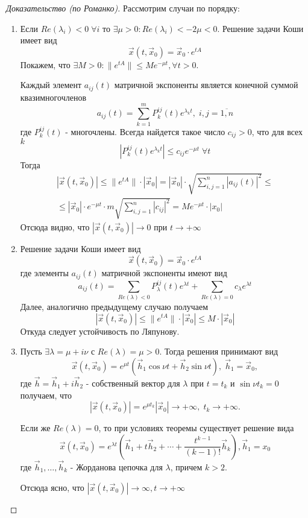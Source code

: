 \begin{proof}[Доказательство (по Романко)]
	Рассмотрим случаи по порядку:
	\begin{enumerate}
		\item Если $Re(\lambda_i)<0 \; \forall i$ то $\exists \mu >0 : Re(\lambda_i)< -2\mu < 0$. Решение задачи Коши имеет вид 
		\[
			\vec{x}(t, \vec{x}_0) = \vec{x}_0\cdot e^{tA}
		\]
		Покажем, что $\exists M>0: \|e^{tA}\| \leqslant Me^{-\mu t}, \forall t>0$.
		
		Каждый элемент $a_{ij}(t)$ матричной экспоненты является конечной суммой квазимногочленов
		\[
			a_{ij}(t) = \sum_{k=1}^m P_k^{ij}(t)e^{\lambda_kt},\;  i,j=\overline{1,n}
		\]
		где $P_k^{ij}(t)$ - многочлены. Всегда найдется такое число $c_{ij}>0$, что для всех $k$
		\[
			|P_k^{ij}(t)e^{\lambda_kt}|\leqslant c_{ij}e^{-\mu t} \; \forall t
		\]
		Тогда
		\begin{multline*}
		|\vec{x}(t, \vec{x}_0)|\leqslant \|e^{tA}\|\cdot|\vec{x}_0| = |\vec{x}_0|\cdot\sqrt{\sum_{i,j=1}^n|a_{ij}(t)|^2}\leqslant\\\leqslant|\vec{x}_0|\cdot e^{-\mu t}\cdot m \sqrt{\sum_{i,j=1}^n|c_{ij}|^2} = Me^{-\mu t}\cdot |x_0|
		\end{multline*}
		Отсюда видно, что $|\vec{x}(t, \vec{x}_0)| \to 0$ при $t \to +\infty$
	\item 
		Решение задачи Коши имеет вид 
		\[
		\vec{x}(t, \vec{x}_0) = \vec{x}_0\cdot e^{tA}
		\]
		где элементы $a_{ij}(t)$ матричной экспоненты имеют вид
		\[
			a_{ij}(t) = \sum_{Re(\lambda) < 0}P_\lambda^{ij}(t)e^{\lambda t} + \sum_{Re(\lambda)=0}c_\lambda e^{\lambda t}
		\]
		Далее, аналогично предыдущему случаю получаем
		\[
			|\vec{x}(t, \vec{x}_0)| \leqslant \|e^{tA}\|\cdot|\vec{x}_0| \leqslant M\cdot|\vec{x}_0| 
		\]
		Откуда следует устойчивость по Ляпунову.
	\item
		Пусть $\exists \lambda = \mu + i \nu$ с $Re(\lambda) = \mu >0$. Тогда решения принимают вид
		\[
			\vec{x}(t, \vec{x}_0) = e^{\mu t}(\vec{h}_1\cos{\nu t}+ \vec{h}_2\sin{\nu t}), \; \vec{h}_1 = \vec{x}_0,
		\]
		где $\vec{h} = \vec{h}_1 + i\vec{h}_2$ - собственный вектор для $\lambda$ при $t = t_k$ и $\sin{\nu t_k} = 0$ получаем, что
		\[
			|\vec{x}(t, \vec{x}_0)| = e^{\mu t_k}|\vec{x}_0| \to +\infty,\; t_k\to+\infty.
		\]
		
		Если же $Re(\lambda) = 0$, то при условиях теоремы существует решение вида
		\[
			\vec{x}(t, \vec{x}_0) = e^{\lambda t}\left( \vec{h}_1 + t\vec{h}_2 + \cdots + \frac{t^{k-1}}{(k-1)!}\vec{h}_k\right), \vec{h}_1=x_0
		\]
		где $\vec{h}_1, \dots,\vec{h}_k$ - Жорданова цепочка для $\lambda$, причем $k>2$. 
		
		Отсюда ясно, что $|\vec{x}(t, \vec{x}_0)| \to \infty, t\to +\infty$
		
	\end{enumerate}
\end{proof}
